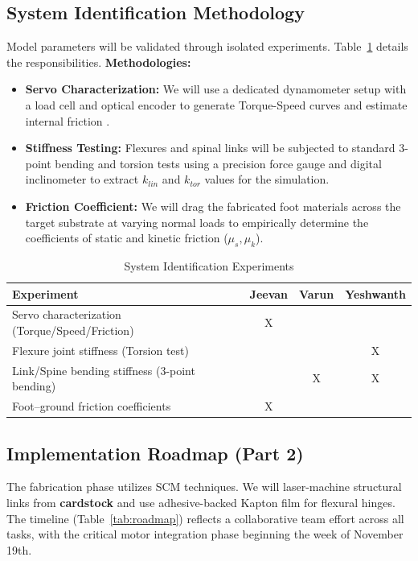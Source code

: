 \documentclass[11pt, letterpaper]{article}
\begin{document}
\subsection{System Identification Methodology}
Model parameters will be validated through isolated experiments. Table~\ref{tab:sysid} details the responsibilities.
\textbf{Methodologies:}
\begin{itemize}
    \item \textbf{Servo Characterization:} We will use a dedicated dynamometer setup with a load cell and optical encoder to generate Torque-Speed curves and estimate internal friction \cite{hoffman2011myriapod}.
    \item \textbf{Stiffness Testing:} Flexures and spinal links will be subjected to standard 3-point bending and torsion tests using a precision force gauge and digital inclinometer to extract $k_{lin}$ and $k_{tor}$ values for the simulation.
    \item \textbf{Friction Coefficient:} We will drag the fabricated foot materials across the target substrate at varying normal loads to empirically determine the coefficients of static and kinetic friction ($\mu_s, \mu_k$).
\end{itemize}

\vspace{-2ex}
\begin{table}[H]
  \centering
  \caption{System Identification Experiments}
  \label{tab:sysid}
  \begin{tabular}{lccc}
    \toprule
    \textbf{Experiment} & \textbf{Jeevan} & \textbf{Varun} & \textbf{Yeshwanth} \\
    \midrule
    Servo characterization (Torque/Speed/Friction) & X & & \\
    Flexure joint stiffness (Torsion test) & & & X \\
    Link/Spine bending stiffness (3-point bending) & & X & X \\
    Foot--ground friction coefficients & X & & \\
    \bottomrule
  \end{tabular}
\end{table}

\subsection{Implementation Roadmap (Part 2)}
The fabrication phase utilizes SCM techniques. We will laser-machine structural links from \textbf{cardstock} and use adhesive-backed Kapton film for flexural hinges. The timeline (Table~\ref{tab:roadmap}) reflects a collaborative team effort across all tasks, with the critical motor integration phase beginning the week of November 19th.
\end{document}
